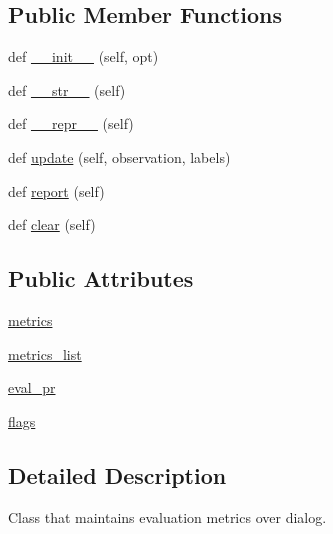 \subsection*{Public Member Functions}
\begin{DoxyCompactItemize}
\item 
def \hyperlink{classparlai_1_1core_1_1metrics_1_1Metrics_a58ecf4b635e97145e7cea37acac9f8d8}{\+\_\+\+\_\+init\+\_\+\+\_\+} (self, opt)
\item 
def \hyperlink{classparlai_1_1core_1_1metrics_1_1Metrics_a3d15255e3daf76e9aeabd23c94f879cf}{\+\_\+\+\_\+str\+\_\+\+\_\+} (self)
\item 
def \hyperlink{classparlai_1_1core_1_1metrics_1_1Metrics_a652e6f48f5754c1365f18a7f2c86353b}{\+\_\+\+\_\+repr\+\_\+\+\_\+} (self)
\item 
def \hyperlink{classparlai_1_1core_1_1metrics_1_1Metrics_ab1a5a659f2c5747af5d0b674dc647742}{update} (self, observation, labels)
\item 
def \hyperlink{classparlai_1_1core_1_1metrics_1_1Metrics_ae96ffa8a0a1044cdcfcf6cf15fa139ee}{report} (self)
\item 
def \hyperlink{classparlai_1_1core_1_1metrics_1_1Metrics_a72759455e9d5ebab2775aed1fa7f952a}{clear} (self)
\end{DoxyCompactItemize}
\subsection*{Public Attributes}
\begin{DoxyCompactItemize}
\item 
\hyperlink{classparlai_1_1core_1_1metrics_1_1Metrics_ad4d95ce9a2d1fdecf7fd9ef7cf282a15}{metrics}
\item 
\hyperlink{classparlai_1_1core_1_1metrics_1_1Metrics_ae0d3620f86dd5cd08e4d1c097ac6dde4}{metrics\+\_\+list}
\item 
\hyperlink{classparlai_1_1core_1_1metrics_1_1Metrics_a6bf169112945fa8e28547e8c4464b5d6}{eval\+\_\+pr}
\item 
\hyperlink{classparlai_1_1core_1_1metrics_1_1Metrics_a8075a929d40c06f5bbae755b98126c71}{flags}
\end{DoxyCompactItemize}


\subsection{Detailed Description}
\begin{DoxyVerb}Class that maintains evaluation metrics over dialog.\end{DoxyVerb}
 

